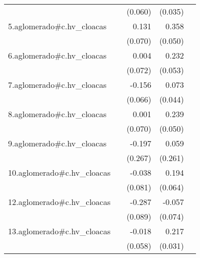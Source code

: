 {\begin{longtable}{l*{4}{D{.}{.}{-1}}}
            &                     &     (0.060)         &     (0.035)         &                     \\
\addlinespace
5.aglomerado#c.hv\_cloacas&                     &       0.131         &       0.358\sym{***}&                     \\
            &                     &     (0.070)         &     (0.050)         &                     \\
\addlinespace
6.aglomerado#c.hv\_cloacas&                     &       0.004         &       0.232\sym{***}&                     \\
            &                     &     (0.072)         &     (0.053)         &                     \\
\addlinespace
7.aglomerado#c.hv\_cloacas&                     &      -0.156\sym{*}  &       0.073         &                     \\
            &                     &     (0.066)         &     (0.044)         &                     \\
\addlinespace
8.aglomerado#c.hv\_cloacas&                     &       0.001         &       0.239\sym{***}&                     \\
            &                     &     (0.070)         &     (0.050)         &                     \\
\addlinespace
9.aglomerado#c.hv\_cloacas&                     &      -0.197         &       0.059         &                     \\
            &                     &     (0.267)         &     (0.261)         &                     \\
\addlinespace
10.aglomerado#c.hv\_cloacas&                     &      -0.038         &       0.194\sym{**} &                     \\
            &                     &     (0.081)         &     (0.064)         &                     \\
\addlinespace
12.aglomerado#c.hv\_cloacas&                     &      -0.287\sym{**} &      -0.057         &                     \\
            &                     &     (0.089)         &     (0.074)         &                     \\
\addlinespace
13.aglomerado#c.hv\_cloacas&                     &      -0.018         &       0.217\sym{***}&                     \\
            &                     &     (0.058)         &     (0.031)         &                     \\

\end{longtable}}
